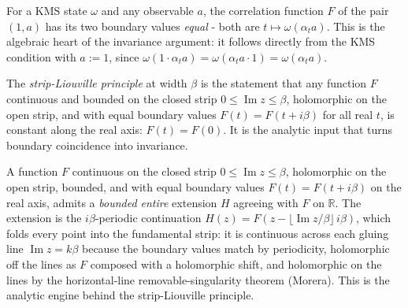 \begin{lemma}[Boundary Coincidence for $a = 1$]
    \label{lmm:kms-correlation-one}
    \leanok
    For a KMS state $\omega$ and any observable $a$, the correlation function $F$ of the pair $(1, a)$ has its two boundary values \emph{equal} - both are $t \mapsto \omega(\alpha_t a)$. This is the algebraic heart of the invariance argument: it follows directly from the KMS condition with $a := 1$, since $\omega(1\cdot\alpha_t a) = \omega(\alpha_t a \cdot 1) = \omega(\alpha_t a)$.
\end{lemma}

\begin{definition}
    \label{def:strip-liouville}
    \leanok
    The \emph{strip-Liouville principle} at width $\beta$ is the statement that any function $F$ continuous and bounded on the closed strip $0 \le \operatorname{Im} z \le \beta$, holomorphic on the open strip, and with equal boundary values $F(t) = F(t + i\beta)$ for all real $t$, is constant along the real axis: $F(t) = F(0)$. It is the analytic input that turns boundary coincidence into invariance.
\end{definition}

\begin{theorem}
    \label{thrm:strip-periodic-extension}
    \leanok
    A function $F$ continuous on the closed strip $0 \le \operatorname{Im} z \le \beta$, holomorphic on the open strip, bounded, and with equal boundary values $F(t) = F(t + i\beta)$ on the real axis, admits a \emph{bounded entire} extension $H$ agreeing with $F$ on $\mathbb{R}$. The extension is the $i\beta$-periodic continuation $H(z) = F\!\left(z - \lfloor \operatorname{Im} z / \beta \rfloor\, i\beta\right)$, which folds every point into the fundamental strip: it is continuous across each gluing line $\operatorname{Im} z = k\beta$ because the boundary values match by periodicity, holomorphic off the lines as $F$ composed with a holomorphic shift, and holomorphic on the lines by the horizontal-line removable-singularity theorem (Morera). This is the analytic engine behind the strip-Liouville principle.
\end{theorem}

